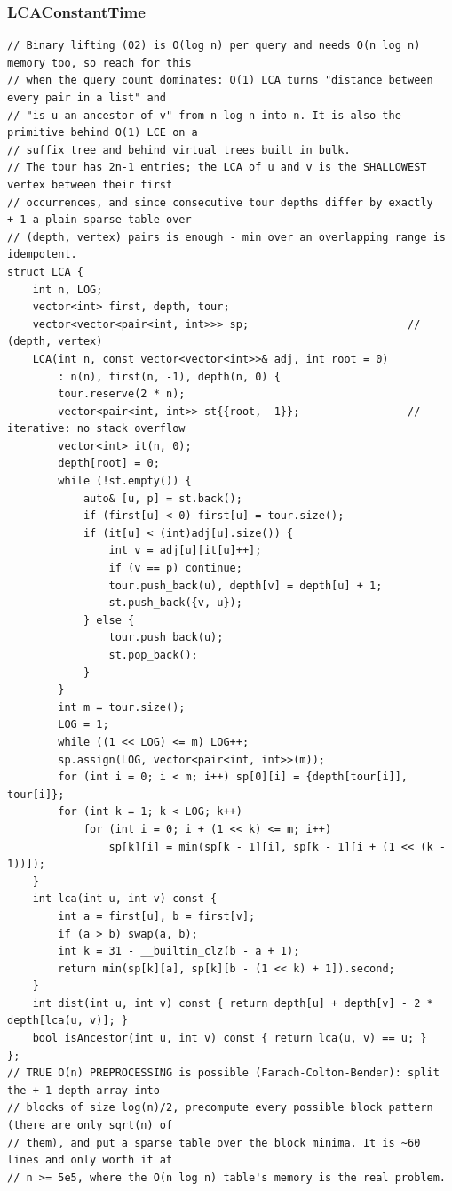 \documentclass[9pt,a4paper,twocolumn]{extarticle}
\begin{document}
\filbreak
\subsubsection{LCAConstantTime}
\nopagebreak
\begin{lstlisting}
// Binary lifting (02) is O(log n) per query and needs O(n log n) memory too, so reach for this
// when the query count dominates: O(1) LCA turns "distance between every pair in a list" and
// "is u an ancestor of v" from n log n into n. It is also the primitive behind O(1) LCE on a
// suffix tree and behind virtual trees built in bulk.
// The tour has 2n-1 entries; the LCA of u and v is the SHALLOWEST vertex between their first
// occurrences, and since consecutive tour depths differ by exactly +-1 a plain sparse table over
// (depth, vertex) pairs is enough - min over an overlapping range is idempotent.
struct LCA {
    int n, LOG;
    vector<int> first, depth, tour;
    vector<vector<pair<int, int>>> sp;                         // (depth, vertex)
    LCA(int n, const vector<vector<int>>& adj, int root = 0)
        : n(n), first(n, -1), depth(n, 0) {
        tour.reserve(2 * n);
        vector<pair<int, int>> st{{root, -1}};                 // iterative: no stack overflow
        vector<int> it(n, 0);
        depth[root] = 0;
        while (!st.empty()) {
            auto& [u, p] = st.back();
            if (first[u] < 0) first[u] = tour.size();
            if (it[u] < (int)adj[u].size()) {
                int v = adj[u][it[u]++];
                if (v == p) continue;
                tour.push_back(u), depth[v] = depth[u] + 1;
                st.push_back({v, u});
            } else {
                tour.push_back(u);
                st.pop_back();
            }
        }
        int m = tour.size();
        LOG = 1;
        while ((1 << LOG) <= m) LOG++;
        sp.assign(LOG, vector<pair<int, int>>(m));
        for (int i = 0; i < m; i++) sp[0][i] = {depth[tour[i]], tour[i]};
        for (int k = 1; k < LOG; k++)
            for (int i = 0; i + (1 << k) <= m; i++)
                sp[k][i] = min(sp[k - 1][i], sp[k - 1][i + (1 << (k - 1))]);
    }
    int lca(int u, int v) const {
        int a = first[u], b = first[v];
        if (a > b) swap(a, b);
        int k = 31 - __builtin_clz(b - a + 1);
        return min(sp[k][a], sp[k][b - (1 << k) + 1]).second;
    }
    int dist(int u, int v) const { return depth[u] + depth[v] - 2 * depth[lca(u, v)]; }
    bool isAncestor(int u, int v) const { return lca(u, v) == u; }
};
// TRUE O(n) PREPROCESSING is possible (Farach-Colton-Bender): split the +-1 depth array into
// blocks of size log(n)/2, precompute every possible block pattern (there are only sqrt(n) of
// them), and put a sparse table over the block minima. It is ~60 lines and only worth it at
// n >= 5e5, where the O(n log n) table's memory is the real problem.


\end{lstlisting}
\end{document}
